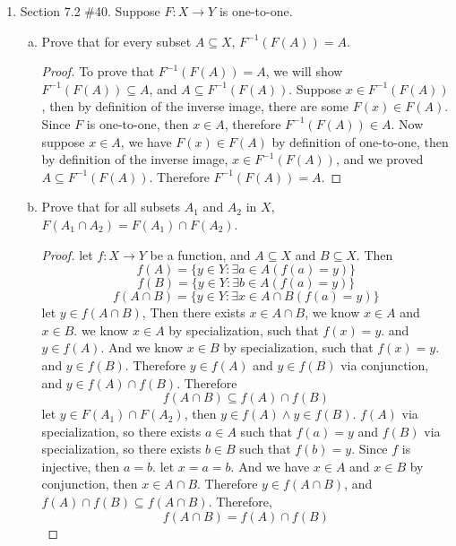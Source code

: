 \documentclass[12pt]{article}
\newcommand{\paren}[1]{\left( #1 \right)}
\begin{document}
\begin{enumerate}
\begin{enumerate}
\begin{proof}
                \end{proof}
                
        \end{enumerate}
    \newpage
    \item Section 7.2 \#40. Suppose \( F: X \to Y \) is one-to-one.

        \begin{enumerate}[a.]
            \item Prove that for every subset \( A \subseteq X \), \( F^{-1}(F(A)) = A \).
                \begin{proof}
                   
                    To prove that $F^{-1}(F(A)) = A$, we will show $F^{-1}(F(A)) \subseteq A$, and $A \subseteq F^{-1}(F(A))$. Suppose $x \in F^{-1}(F(A))$, then by definition of the inverse image, there are some $F(x) \in F(A)$. Since $F$ is one-to-one, then $x \in A$, therefore $F^{-1}(F(A)) \in A$. Now suppose $x \in A$, we have $F(x) \in F(A)$ by definition of one-to-one, then by definition of the inverse image, $x \in F^{-1}(F(A))$, and we proved $A \subseteq F^{-1}(F(A))$. Therefore $F^{-1}(F(A)) = A$.
                    
                \end{proof}
            \item Prove that for all subsets \( A_1 \) and \( A_2 \) in \( X \), \( F(A_1 \cap A_2) = F(A_1) \cap F(A_2) \).

                \begin{proof}
                let $f \colon X \to Y$ be a function, and $A \subseteq X$ and $B \subseteq X$.
                Then 
                \[
                f(A) = \{ y \in Y \colon \exists a\in A\paren{f(a) = y}\}
                \]
                \[
                f(B) = \{ y \in Y \colon \exists b\in A\paren{f(a) = y}\}
                \]
                \[
                f(A \cap B) = \{ y \in Y \colon \exists x\in A \cap B \paren{f(a) = y}\}
                \]
                let $y \in f(A\cap B)$, Then there exists $x \in A \cap B$, we know $x \in A$ and $x \in B$. we know $x \in A$ by specialization, such that $f(x) = y$. and $y \in f(A)$. And we know $x \in B$ by specialization, such that $f(x) = y$. and $y \in f(B)$. Therefore $y \in f(A)$ and $y \in f(B)$ via conjunction, and $y \in f(A) \cap f(B)$. Therefore 
                \[
                 f(A \cap B) \subseteq f(A)\cap f(B)
                \]
                let $y \in  F(A_1) \cap F(A_2)$, then $y \in f(A) \wedge y \in f(B)$. $f(A)$ via specialization, so there exists $a \in A$ such that $f(a) = y$ and $f(B)$ via specialization, so there exists $b \in B$ such that $f(b) = y$. Since $f$ is injective, then $a=b$. let $x = a = b$. And we have $x \in A$ and $x \in B$ by conjunction, then $x \in A \cap B$. Therefore $ y \in f(A \cap B)$, and $f(A)\cap f(B) \subseteq f(A \cap B)$. Therefore,
                \[
                f(A \cap B) = f(A)\cap f(B)
                \]
                \end{proof}
        \end{enumerate}


\end{enumerate}
\end{document}
